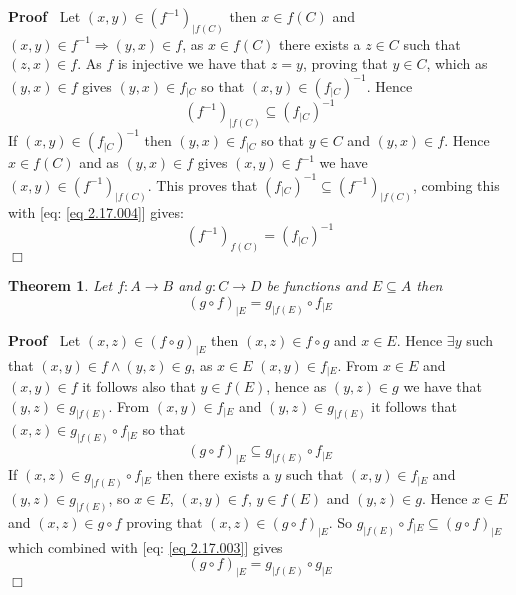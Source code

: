 \documentclass{book}
\newcommand{\tmtextbf}[1]{\text{{\bfseries{#1}}}}
\newenvironment{proof}{\noindent\textbf{Proof\ }}{\hspace*{\fill}$\Box$\medskip}
\newtheorem{theorem}{Theorem}
\begin{document}
\begin{proof}
  Let $(x, y) \in (f^{- 1})_{|f (C)}$ then $x \in f (C)$ and $(x, y) \in f^{-
  1} \Rightarrow (y, x) \in f$, as $x \in f (C)$ there exists a $z \in C$ such
  that $(z, x) \in f$. As $f$ is injective we have that $z = y$, proving that
  $y \in C$, which as $(y, x) \in f$ gives $(y, x) \in f_{|C}$ so that $(x, y)
  \in (f_{|C})^{- 1}$. Hence
  \begin{equation}
    \label{eq 2.17.004} (f^{- 1})_{|f (C)} \subseteq (f_{|C})^{- 1}
  \end{equation}
  If $(x, y) \in (f_{|C})^{- 1}$ then $(y, x) \in f_{|C}$ so that $y \in C$
  and $(y, x) \in f$. Hence $x \in f (C)$ and as $(y, x) \in f$ gives $(x, y)
  \in f^{- 1}$ we have $(x, y) \in (f^{- 1})_{|f (C)}$. This proves that
  $(f_{|C})^{- 1} \subseteq (f^{- 1})_{|f (C)}$, combing this with [eq:
  \ref{eq 2.17.004}] gives:
  \[ (f^{- 1})_{f (C)} = (f_{|C})^{- 1} \]
\end{proof}

\begin{theorem}
  \label{function composition and restriction}Let $f : A \rightarrow B$ and $g
  : C \rightarrow D$ be \tmtextbf{partial} functions and $E \subseteq A$ then
  \[ (g \circ f)_{|E} = g_{|f (E)} \circ f_{|E} \]
\end{theorem}

\begin{proof}
  Let $(x, z) \in (f \circ g)_{|E}$ then $(x, z) \in f \circ g$ and $x \in E$.
  Hence $\exists y$ such that $(x, y) \in f \wedge (y, z) \in g$, as $x \in E$
  $(x, y) \in f_{|E}$. From $x \in E$ and $(x, y) \in f$ it follows also that
  $y \in f (E)$, hence as $(y, z) \in g$ we have that $(y, z) \in g_{|f (E)}$.
  From $(x, y) \in f_{|E}$ and $(y, z) \in g_{|f (E)}$ it follows that $(x, z)
  \in g_{|f (E)} \circ f_{|E}$ so that
  \begin{equation}
    \label{eq 2.17.003} (g \circ f)_{|E} \subseteq g_{|f (E)} \circ f_{|E}
  \end{equation}
  If $(x, z) \in g_{|f (E)} \circ f_{|E}$ then there exists a $y$ such that
  $(x, y) \in f_{|E}$ and $(y, z) \in g_{|f (E)}$, so $x \in E$, $(x, y) \in
  f$, $y \in f (E)$ and $(y, z) \in g$. Hence $x \in E$ and $(x, z) \in g
  \circ f$ proving that $(x, z) \in (g \circ f)_{|E} .$ So $g_{|f (E)} \circ
  f_{|E} \subseteq (g \circ f)_{|E}$ which combined with [eq: \ref{eq
  2.17.003}] gives
  \[ (g \circ f)_{|E} = g_{|f (E)} \circ g_{|E} \]
\end{proof}
\end{document}

